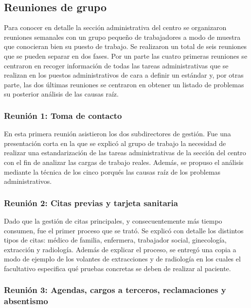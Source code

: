\subsection{Reuniones de grupo}

Para conocer en detalle la sección administrativa del centro se organizaron reuniones semanales con un grupo pequeño de trabajadores a modo de muestra que conocieran bien su puesto de trabajo.
Se realizaron un total de seis reuniones que se pueden separar en dos fases.
Por un parte las cuatro primeras reuniones se centraron en recoger información de todas las tareas administrativas que se realizan en los puestos administrativos de cara a definir un estándar y, por otras parte, las dos últimas reuniones se centraron en obtener un listado de problemas su posterior análisis de las causas raíz.

\subsubsection{Reunión 1: Toma de contacto}

En esta primera reunión asistieron los dos subdirectores de gestión. Fue una presentación corta en la que se explicó al grupo de trabajo la necesidad de realizar una estandarización de las tareas administrativas de la sección del centro con el fin de analizar las cargas de trabajo reales. Además, se propuso el análisis mediante la técnica de los cinco porqués las causas raíz de los problemas administrativos.

\subsubsection{Reunión 2: Citas previas y tarjeta sanitaria}

Dado que la gestión de citas principales, y consecuentemente más tiempo consumen, fue el primer proceso que se trató. Se explicó con detalle los distintos tipos de citas: médico de familia, enfermera, trabajador social, ginecología, extracción y radiología. Además de explicar el proceso, se entregó una copia a modo de ejemplo de los volantes de extracciones y de radiología en los cuales el facultativo especifica qué pruebas concretas se deben de realizar al paciente.

\subsubsection{Reunión 3: Agendas, cargos a terceros, reclamaciones y absentismo}

